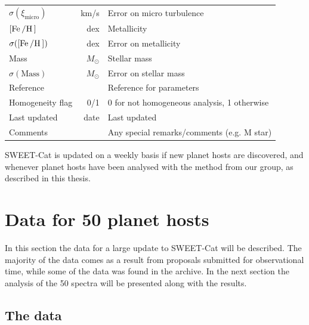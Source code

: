 \begin{table}[htb!]
\begin{tabular}{lrl}
      $\sigma(\xi_\mathrm{micro})$   & \si{km/s} & Error on micro turbulence                            \\
      $[\ion{Fe}/\ion{H}]$           & \si{dex}  & Metallicity                                          \\
      $\sigma([\ion{Fe}/\ion{H}])$   & \si{dex}  & Error on metallicity                                 \\
      Mass                           & $M_\odot$ & Stellar mass                                         \\
      $\sigma(\mathrm{Mass})$        & $M_\odot$ & Error on stellar mass                                \\
      Reference                      &           & Reference for parameters                             \\
      Homogeneity flag               & 0/1       & 0 for not homogeneous analysis, 1 otherwise          \\
      Last updated                   & date      & Last updated                                         \\
      Comments                       &           & Any special remarks/comments (e.g. M star)           \\
      \hline
    \end{tabular}
\end{table}

SWEET-Cat is updated on a weekly basis if new planet hosts are discovered, and whenever planet hosts
have been analysed with the method from our group, as described in this thesis.


\section{Data for 50 planet hosts}

In this section the data for a large update to SWEET-Cat will be described. The majority of the data
comes as a result from proposals submitted for observational time, while some of the data was found
in the archive. In the next section the analysis of the 50 spectra will be presented along with the
results.



\subsection{The data}


